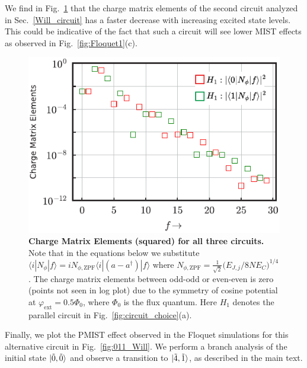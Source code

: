 \documentclass[%
reprint,
superscriptaddress,
 amsmath,amssymb,
 aps,
 prx,
longbibliography,
floatfix,
]{revtex4-2}
\begin{document}
We find in Fig.~\ref{fig:charge-matrix-Will} that the charge matrix elements of the second circuit analyzed in Sec.~\ref{Will_circuit} has a faster decrease with increasing excited state levels. This could be indicative of the fact that such a circuit will see lower MIST effects as observed in Fig.~\ref{fig:Floquet1}(c). 
\begin{figure}[htb]
    \centering
    \includegraphics[width=\linewidth]{Supp_Fig/Charge-matrix-Will.pdf}
    \caption{{\bf Charge Matrix 
 Elements (squared) for all three circuits.} Note that in the equations below we substitute $\langle i|N_\phi|f\rangle=iN_{\phi,\mathrm{ZPF}}\langle i|(a-a^\dagger)|f\rangle$ where $N_{\phi,\mathrm{ZPF}}=\frac{1}{\sqrt{2}}\Big(E_{J,j}/8NE_C\Big)^{1/4}$. The charge matrix elements between odd-odd or even-even is zero (points not seen in log plot) due to the symmetry of cosine potential at $\varphi_\mathrm{ext}=0.5\Phi_0$, where $\Phi_0$ is the flux quantum. Here $H_1$ denotes the parallel circuit in Fig.~\ref{fig:circuit_choice}(a).}
    \label{fig:charge-matrix-Will}
\end{figure}

Finally, we plot the PMIST effect observed in the Floquet simulations for this alternative circuit in Fig.~\ref{fig:011_Will}. We perform a branch analysis of the initial state $\ket{\tilde{0}, \tilde{0}}$ and observe a transition to $\ket{\tilde{4},\tilde{1}}$, as described in the main text. 
\end{document}
